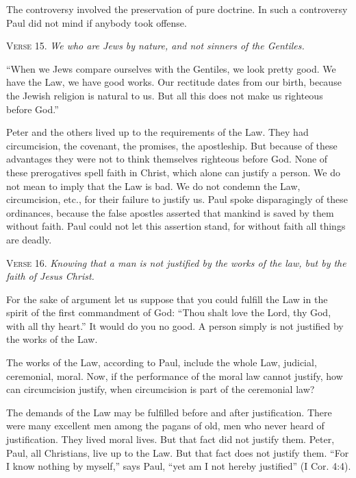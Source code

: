 The controversy involved the preservation of pure doctrine. In such a controversy Paul did not mind if anybody took offense.

\textsc{Verse} 15. \emph{We who are Jews by nature, and not sinners of the Gentiles.}

“When we Jews compare ourselves with the Gentiles, we look pretty good. We have the Law, we have good works. Our rectitude dates from our birth, because the Jewish religion is natural to us. But all this does not make us righteous before God.”

Peter and the others lived up to the requirements of the Law. They had circumcision, the covenant, the promises, the apostleship. But because of these advantages they were not to think themselves righteous before God. None of these prerogatives spell faith in Christ, which alone can justify a person. We do not mean to imply that the Law is bad. We do not condemn the Law, circumcision, etc., for their failure to justify us. Paul spoke disparagingly of these ordinances, because the false apostles asserted that mankind is saved by them without faith. Paul could not let this assertion stand, for without faith all things are deadly.

\textsc{Verse} 16. \emph{Knowing that a man is not justified by the works of the law, but by the faith of Jesus Christ.}

For the sake of argument let us suppose that you could fulfill the Law in the spirit of the first commandment of God: “Thou shalt love the Lord, thy God, with all thy heart.” It would do you no good. A person simply is not justified by the works of the Law.

The works of the Law, according to Paul, include the whole Law, judicial, ceremonial, moral. Now, if the performance of the moral law cannot justify, how can circumcision justify, when circumcision is part of the ceremonial law?

The demands of the Law may be fulfilled before and after justification. There were many excellent men among the pagans of old, men who never heard of justification. They lived moral lives. But that fact did not justify them. Peter, Paul, all Christians, live up to the Law. But that fact does not justify them. “For I know nothing by myself,” says Paul, “yet am I not hereby justified” (I Cor. 4:4).

